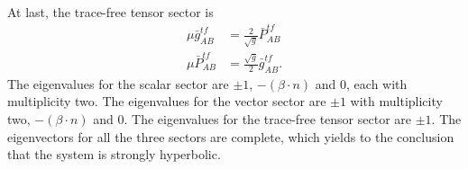 \documentclass[letterpaper,nofootinbib,prd,amsmath,onecolumn]{revtex4-1}
\begin{document}
At last, the trace-free tensor sector is
\begin{subequations}
\begin{align}
\mu {\bar g}^{tf}_{AB} & = \frac{2}{\sqrt{g}}{\bar P}^{tf}_{AB}\\
\mu {\bar P}^{tf}_{AB} & = \frac{\sqrt{g}}{2}{\bar g}^{tf}_{AB}.
\end{align}
\end{subequations}
The eigenvalues for the scalar sector are $\pm 1$, $-\left( \beta \cdot n \right)$ and 0, each with multiplicity two. The eigenvalues for the vector sector are $\pm 1$ with multiplicity two, $-\left( \beta \cdot n \right)$ and 0. The eigenvalues for the trace-free tensor sector are $\pm 1$. The eigenvectors for all the three sectors are complete, which yields to the conclusion that the system is strongly hyperbolic. 
\end{document}
